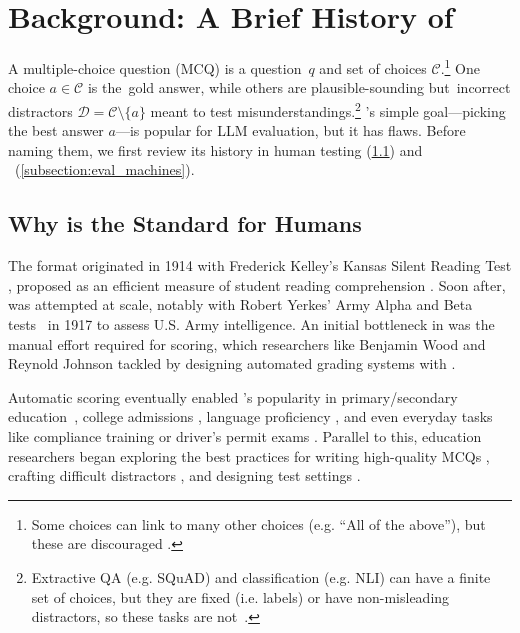 
\section{Background: A Brief History of \mcqa} \label{section:background}

A multiple-choice question (MCQ) is a question~$q$ and set of
choices $\mathcal{C}$.\footnote{Some choices can link to many other choices (e.g. ``All of the above''), but these are discouraged \cite{haladyna2002review}.}
%
One choice $a \in \mathcal{C}$ is the~gold answer, while others
are plausible-sounding but~incorrect distractors $\mathcal{D} = \mathcal{C}\setminus\{a\}$ meant to test misunderstandings.\footnote{Extractive QA (e.g. SQuAD) and classification (e.g. NLI) can have a finite set of choices, but they are fixed (i.e. labels) or have non-misleading distractors, so these tasks are not~\mcqa.}
%
\mcqa's simple goal---picking the best answer $a$---is popular for LLM evaluation, but it has flaws.
%
Before naming them, we first review its history in
human testing (\cref{subsection:eval_humans}) and
~(\cref{subsection:eval_machines}).

\subsection{Why \mcqa{} is the Standard for Humans}
\label{subsection:eval_humans}

The \mcqa format originated in 1914 with Frederick Kelley's Kansas
Silent Reading Test \cite{kelly1916kansas}, proposed as an efficient
measure of student reading comprehension \cite{monroe1917report}.
%
Soon after, \mcqa was attempted at scale, notably with Robert Yerkes’
Army Alpha and Beta tests~\cite{yerkes1918psychology} in 1917 to assess
U.S. Army intelligence.
%
An initial bottleneck in \mcqa was the manual effort required for
scoring, which researchers like Benjamin Wood and Reynold Johnson tackled by designing automated grading systems
\cite{brennan1971ibm, woodcolumbia} with .

Automatic scoring eventually enabled \mcqa's popularity in
primary/secondary education~\cite{butler2018multiple}, college
admissions \cite{daneman2001using}, language proficiency
\cite{jamieson2000toefl}, and even everyday tasks like compliance
training \cite{puhakainen2010improving} or driver's permit exams
\cite{beanland2013there}.
%
%
Parallel to this, education researchers began exploring the best practices for writing high-quality MCQs \cite{morrison2001writing, campbell2011write}, crafting difficult distractors \cite{pho2015distractor, gierl2017developing}, and designing test settings \cite{rakes2008open, shute2013comparison}.

